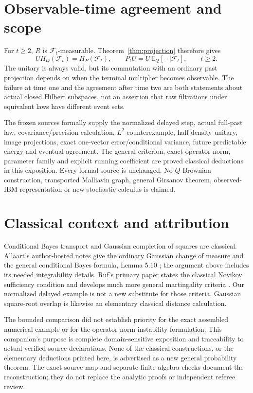 \documentclass[11pt]{article}
\theoremstyle{remark}\newtheorem{remark}[theorem]{Remark}
\newcommand{\E}{\mathbb E}
\newcommand{\F}{\mathcal F}
\begin{document}
\section{Observable-time agreement and scope}
For $t\ge2$, $R$ is $\F_t$-measurable. Theorem~\ref{thm:projection} therefore gives
\[
 U H_Q(\F_t)=H_P(\F_t),\qquad
 P_t U=U\,\E_Q[\,\cdot\mid\F_t],\qquad t\ge2.
\]
The unitary is always valid, but its commutation with an ordinary past projection depends on when the terminal multiplier becomes observable. The failure at time one and the agreement after time two are both statements about actual closed Hilbert subspaces, not an assertion that raw filtrations under equivalent laws have different event sets.

The frozen sources formally supply the normalized delayed step, actual full-past law, covariance/precision calculation, $L^2$ counterexample, half-density unitary, image projections, exact one-vector error/conditional variance, future predictable energy and eventual agreement. The general criterion, exact operator norm, parameter family and explicit running coefficient are proved classical deductions in this exposition. Every formal source is unchanged. No $Q$-Brownian construction, transported Malliavin graph, general Girsanov theorem, observed-IBM representation or new stochastic calculus is claimed.

\section{Classical context and attribution}
Conditional Bayes transport and Gaussian completion of squares are classical. Allaart's author-hosted notes give the ordinary Gaussian change of measure and the general conditional Bayes formula, Lemma 5.10 \cite{allaart}; the argument above includes its needed integrability details. Ruf's primary paper states the classical Novikov sufficiency condition and develops much more general martingality criteria \cite{ruf}. Our normalized delayed example is not a new substitute for those criteria. Gaussian square-root overlap is likewise an elementary classical distance calculation.

The bounded comparison did not establish priority for the exact assembled numerical example or for the operator-norm instability formulation. This companion's purpose is complete domain-sensitive exposition and traceability to actual verified source declarations. None of the classical constructions, or the elementary deductions printed here, is advertised as a new general probability theorem. The exact source map and separate finite algebra checks document the reconstruction; they do not replace the analytic proofs or independent referee review.
\end{document}
